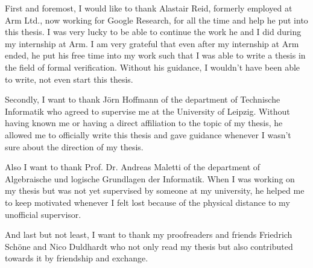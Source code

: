 
First and foremost, I would like to thank Alastair Reid, formerly employed at Arm Ltd., now working for Google Research, for all the time and help he put into this thesis.
I was very lucky to be able to continue the work he and I did during my internship at Arm.
I am very grateful that even after my internship at Arm ended, he put his free time into my work such that I was able to write a thesis in the field of formal verification.
Without his guidance, I wouldn't have been able to write, not even start this thesis.

Secondly, I want to thank Jörn Hoffmann of the department of Technische Informatik who agreed to supervise me at the University of Leipzig.
Without having known me or having a direct affiliation to the topic of my thesis, he allowed me to officially write this thesis and gave guidance whenever I wasn't sure about the direction of my thesis.

Also I want to thank Prof. Dr. Andreas Maletti of the department of Algebraische und logische Grundlagen der Informatik.
When I was working on my thesis but was not yet supervised by someone at my university, he helped me to keep motivated whenever I felt lost because of the physical distance to my unofficial supervisor.

And last but not least, I want to thank my proofreaders and friends Friedrich Schöne and Nico Duldhardt who not only read my thesis but also contributed towards it by friendship and exchange.
